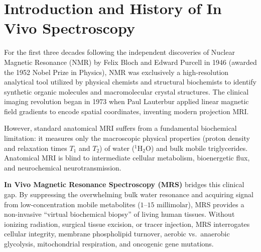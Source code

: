 \documentclass[11pt,a4paper]{article}
\begin{document}
\tableofcontents
\newpage

\section{Introduction and History of In Vivo Spectroscopy}
For the first three decades following the independent discoveries of Nuclear Magnetic Resonance (NMR) by Felix Bloch and Edward Purcell in 1946 (awarded the 1952 Nobel Prize in Physics), NMR was exclusively a high-resolution analytical tool utilized by physical chemists and structural biochemists to identify synthetic organic molecules and macromolecular crystal structures. The clinical imaging revolution began in 1973 when Paul Lauterbur applied linear magnetic field gradients to encode spatial coordinates, inventing modern projection MRI.

However, standard anatomical MRI suffers from a fundamental biochemical limitation: it measures only the macroscopic physical properties (proton density and relaxation times $T_1$ and $T_2$) of water ($^1\text{H}_2\text{O}$) and bulk mobile triglycerides. Anatomical MRI is blind to intermediate cellular metabolism, bioenergetic flux, and neurochemical neurotransmission. 

\textbf{In Vivo Magnetic Resonance Spectroscopy (MRS)} bridges this clinical gap. By suppressing the overwhelming bulk water resonance and acquiring signal from low-concentration mobile metabolites ($1\text{--}15\text{ millimolar}$), MRS provides a non-invasive ``virtual biochemical biopsy'' of living human tissues. Without ionizing radiation, surgical tissue excision, or tracer injection, MRS interrogates cellular integrity, membrane phospholipid turnover, aerobic vs.\ anaerobic glycolysis, mitochondrial respiration, and oncogenic gene mutations.
\end{document}
